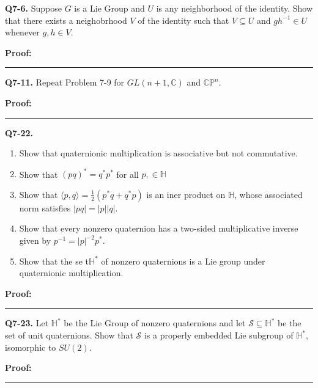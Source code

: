 \documentclass{article}
\newcommand{\C}{\mathbb{C}}
\begin{document}
\textbf{Q7-6.} Suppose $G$ is a Lie Group and $U$ is any neighborhood of the identity. Show that there exists a neighobrhood $V$ of the identity such that $V \subseteq U$ and $g h^{-1} \in U$ whenever $g, h \in V$.

\vskip 0.5cm
\textbf{Proof:}


\vskip 0.5cm
\hrule 
\vskip 0.5cm


\textbf{Q7-11.} Repeat Problem 7-9 for $GL(n+1, \C)$ and $\mathbb{CP}^n$.

\vskip 0.5cm
\textbf{Proof:}


\vskip 0.5cm
\hrule 
\vskip 0.5cm


\textbf{Q7-22.} 
\begin{enumerate}[label=(\alph*)]
  \item Show that quaternionic multiplication is associative but not commutative.
  \item Show that $(pq)^* = q^* p^*$ for all $p, \in \mathbb{H}$
  \item Show that $\langle p, q \rangle = \frac{1}{2}\left(p^* q + q^* p\right)$ is an iner product on $\mathbb{H}$, whose associated norm satisfies $|pq| = |p||q|$.
  \item Show that every nonzero quaternion has a two-sided multiplicative inverse given by $p^{-1} = |p|^{-2} p^*$.
  \item Show that the se t$\mathbb{H}^*$ of nonzero quaternions is a Lie group under quaternionic multiplication.
\end{enumerate}


\vskip 0.5cm
\textbf{Proof:}


\vskip 0.5cm
\hrule 
\vskip 0.5cm


\textbf{Q7-23.} Let $\mathbb{H}^*$ be the Lie Group of nonzero quaternions and let $\mathcal{S} \subseteq \mathbb{H}^*$ be the set of unit quaternions. Show that $\mathcal{S}$ is a properly embedded Lie subgroup of $\mathbb{H}^*$, isomorphic to $SU(2)$. 

\vskip 0.5cm
\textbf{Proof:}


\vskip 0.5cm
\hrule 
\vskip 0.5cm









\end{document}
